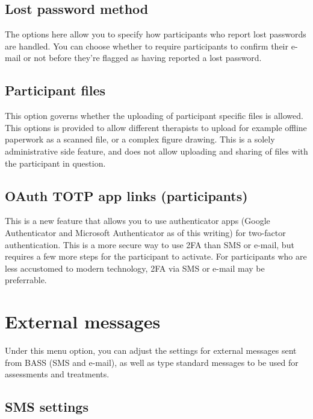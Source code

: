 \documentclass[]{book}
\begin{document}
\hypertarget{lost-password-method}{%
\section{Lost password method}\label{lost-password-method}}

The options here allow you to specify how participants who report lost passwords are handled. You can choose whether to require participants to confirm their e-mail or not before they're flagged as having reported a lost password.

\hypertarget{participant-files}{%
\section{Participant files}\label{participant-files}}

This option governs whether the uploading of participant specific files is allowed. This options is provided to allow different therapists to upload for example offline paperwork as a scanned file, or a complex figure drawing. This is a solely administrative side feature, and does not allow uploading and sharing of files with the participant in question.

\hypertarget{oauth-totp-app-links-participants}{%
\section{OAuth TOTP app links (participants)}\label{oauth-totp-app-links-participants}}

This is a new feature that allows you to use authenticator apps (Google Authenticator and Microsoft Authenticator as of this writing) for two-factor authentication. This is a more secure way to use 2FA than SMS or e-mail, but requires a few more steps for the participant to activate. For participants who are less accustomed to modern technology, 2FA via SMS or e-mail may be preferrable.

\hypertarget{external-messages}{%
\chapter{External messages}\label{external-messages}}

Under this menu option, you can adjust the settings for external messages sent from BASS (SMS and e-mail), as well as type standard messages to be used for assessments and treatments.

\hypertarget{sms-settings}{%
\section{SMS settings}\label{sms-settings}}
\end{document}
